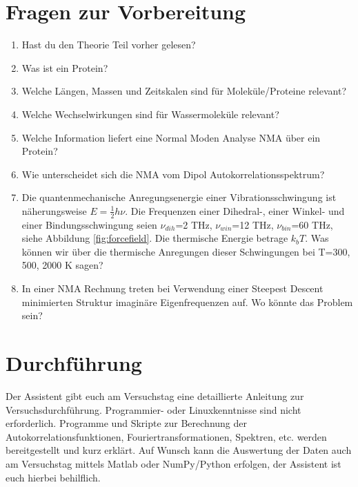 \documentclass[a4paper,12pt]{article}
\begin{document}
\section*{Fragen zur Vorbereitung}
\begin{enumerate}
 \item Hast du den Theorie Teil vorher gelesen?
 \item Was ist ein Protein?
 \item Welche Längen, Massen und Zeitskalen sind für Moleküle/Proteine relevant?
 \item Welche Wechselwirkungen sind für Wassermoleküle relevant?
 \item Welche Information liefert eine Normal Moden Analyse NMA über ein Protein?
 \item Wie unterscheidet sich die NMA vom Dipol Autokorrelationsspektrum?
 \item Die quantenmechanische Anregungsenergie einer Vibrationsschwingung ist näherungsweise $E=\frac{1}{2}h \nu$. Die Frequenzen einer Dihedral-, 
 einer Winkel- und einer Bindungsschwingung seien $\nu_{dih}$=2 THz, $\nu_{win}$=12 THz, $\nu_{bin}$=60 THz, siehe Abbildung \ref{fig:forcefield}. 
 Die thermische Energie betrage $k_bT$.
 Was können wir über die thermische Anregungen dieser Schwingungen bei T=300, 500, 2000 K sagen?
 \item In einer NMA Rechnung treten bei Verwendung einer Steepest Descent minimierten Struktur imaginäre Eigenfrequenzen auf. Wo könnte das Problem sein?
\end{enumerate}

\pagebreak
\section*{Durchführung}
Der Assistent gibt euch am Versuchstag eine detaillierte Anleitung zur Versuchsdurchführung. Programmier- oder Linuxkenntnisse sind nicht erforderlich.
Programme und Skripte zur Berechnung der Autokorrelationsfunktionen, Fouriertransformationen, Spektren, etc. werden bereitgestellt und kurz erklärt. 
Auf Wunsch kann die Auswertung der Daten auch am Versuchstag mittels Matlab oder NumPy/Python erfolgen, der Assistent ist euch hierbei behilflich.
\end{document}
